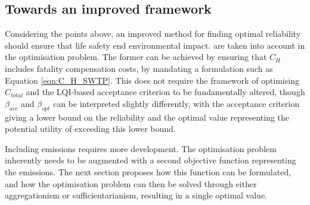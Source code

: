 
\subsection{Towards an improved framework}

Considering the points above, an improved method for finding optimal reliability should ensure that life safety end environmental impact. are taken into account in the optimisation problem.
The former can be achieved by ensuring that $C_H$ includes fatality compensation costs, by mandating a formulation such as Equation \ref{eqn:C_H_SWTP}.
This does not require the framework of optimising $C_{total}$ and the LQI-based acceptance criterion to be fundamentally altered, though $\beta_{acc}$ and $\beta_{opt}$ can be interpreted slightly differently, with the acceptance criterion giving a lower bound on the reliability and the optimal value representing the potential utility of exceeding this lower bound.

Including emissions requires more development. 
The optimisation problem inherently needs to be augmented with a second objective function representing the emissions.
The next section proposes how this function can be formulated, and how the optimisation problem can then be solved through either aggregationism or sufficientarianism, resulting in a single optimal value.



